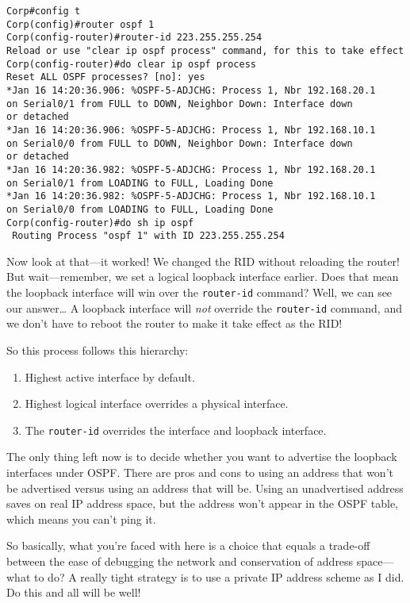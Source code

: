 \begin{verbatim}
Corp#config t
Corp(config)#router ospf 1
Corp(config-router)#router-id 223.255.255.254
Reload or use "clear ip ospf process" command, for this to take effect
Corp(config-router)#do clear ip ospf process
Reset ALL OSPF processes? [no]: yes
*Jan 16 14:20:36.906: %OSPF-5-ADJCHG: Process 1, Nbr 192.168.20.1
on Serial0/1 from FULL to DOWN, Neighbor Down: Interface down
or detached
*Jan 16 14:20:36.906: %OSPF-5-ADJCHG: Process 1, Nbr 192.168.10.1
on Serial0/0 from FULL to DOWN, Neighbor Down: Interface down
or detached
*Jan 16 14:20:36.982: %OSPF-5-ADJCHG: Process 1, Nbr 192.168.20.1
on Serial0/1 from LOADING to FULL, Loading Done
*Jan 16 14:20:36.982: %OSPF-5-ADJCHG: Process 1, Nbr 192.168.10.1
on Serial0/0 from LOADING to FULL, Loading Done
Corp(config-router)#do sh ip ospf
 Routing Process "ospf 1" with ID 223.255.255.254
\end{verbatim}

\protect\hypertarget{c18.xhtmlux5cux23Page_765}{}{}Now look at that---it
worked! We changed the RID without reloading the router! But
wait---remember, we set a logical loopback interface earlier. Does that
mean the loopback interface will win over the \texttt{router-id}
command? Well, we can see our answer\ldots{} A loopback interface will
\emph{not} override the \texttt{router-id} command, and we don't have to
reboot the router to make it take effect as the RID!

So this process follows this hierarchy:

\begin{enumerate}
\tightlist
\item
  Highest active interface by default.
\item
  Highest logical interface overrides a physical interface.
\item
  The \texttt{router-id} overrides the interface and loopback interface.
\end{enumerate}

The only thing left now is to decide whether you want to advertise the
loopback interfaces under OSPF. There are pros and cons to using an
address that won't be advertised versus using an address that will be.
Using an unadvertised address saves on real IP address space, but the
address won't appear in the OSPF table, which means you can't ping it.

So basically, what you're faced with here is a choice that equals a
trade-off between the ease of debugging the network and conservation of
address space---what to do? A really tight strategy is to use a private
IP address scheme as I did. Do this and all will be well!

